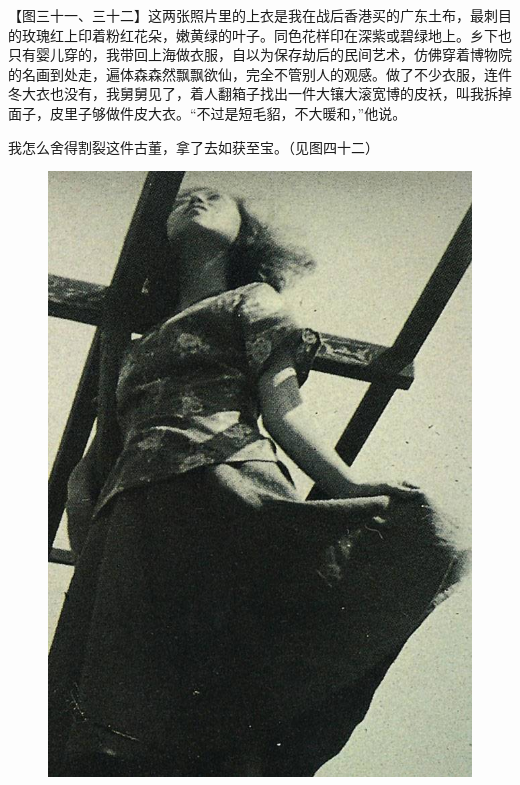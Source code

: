 \clearpage
\par 【图三十一、三十二】这两张照片里的上衣是我在战后香港买的广东土布，最刺目的玫瑰红上印着粉红花朵，嫩黄绿的叶子。同色花样印在深紫或碧绿地上。乡下也只有婴儿穿的，我带回上海做衣服，自以为保存劫后的民间艺术，仿佛穿着博物院的名画到处走，遍体森森然飘飘欲仙，完全不管别人的观感。做了不少衣服，连件冬大衣也没有，我舅舅见了，着人翻箱子找出一件大镶大滚宽博的皮袄，叫我拆掉面子，皮里子够做件皮大衣。“不过是短毛貂，不大暖和，”他说。
\par 我怎么舍得割裂这件古董，拿了去如获至宝。（见图四十二）
\begin{figure}[htb]
    \centering %
    \includegraphics[scale=0.35]{picture/对照记31.jpeg}

\end{figure}
